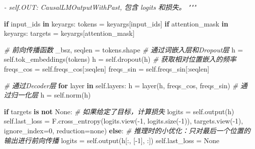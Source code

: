 \documentclass[
]{article}
\newenvironment{Shaded}{}{}
\newcommand{\CommentTok}[1]{\textcolor[rgb]{0.38,0.63,0.69}{\textit{#1}}}
\newcommand{\ControlFlowTok}[1]{\textcolor[rgb]{0.00,0.44,0.13}{\textbf{#1}}}
\newcommand{\DecValTok}[1]{\textcolor[rgb]{0.25,0.63,0.44}{#1}}
\newcommand{\KeywordTok}[1]{\textcolor[rgb]{0.00,0.44,0.13}{\textbf{#1}}}
\newcommand{\NormalTok}[1]{#1}
\newcommand{\OperatorTok}[1]{\textcolor[rgb]{0.40,0.40,0.40}{#1}}
\newcommand{\StringTok}[1]{\textcolor[rgb]{0.25,0.44,0.63}{#1}}
\newcommand{\VariableTok}[1]{\textcolor[rgb]{0.10,0.09,0.49}{#1}}
\begin{document}
\begin{Shaded}
\begin{Highlighting}[]
\CommentTok{        {-} self.OUT: CausalLMOutputWithPast, 包含 logits 和损失。}
\CommentTok{        """}

        \ControlFlowTok{if} \StringTok{\textquotesingle{}input\_ids\textquotesingle{}} \KeywordTok{in}\NormalTok{ keyargs:}
\NormalTok{            tokens }\OperatorTok{=}\NormalTok{ keyargs[}\StringTok{\textquotesingle{}input\_ids\textquotesingle{}}\NormalTok{]}
        \ControlFlowTok{if} \StringTok{\textquotesingle{}attention\_mask\textquotesingle{}} \KeywordTok{in}\NormalTok{ keyargs:}
\NormalTok{            targets }\OperatorTok{=}\NormalTok{ keyargs[}\StringTok{\textquotesingle{}attention\_mask\textquotesingle{}}\NormalTok{]}

        \CommentTok{\# 前向传播函数}
\NormalTok{        \_bsz, seqlen }\OperatorTok{=}\NormalTok{ tokens.shape}
        \CommentTok{\# 通过词嵌入层和Dropout层}
\NormalTok{        h }\OperatorTok{=} \VariableTok{self}\NormalTok{.tok\_embeddings(tokens)}
\NormalTok{        h }\OperatorTok{=} \VariableTok{self}\NormalTok{.dropout(h)}
        \CommentTok{\# 获取相对位置嵌入的频率}
\NormalTok{        freqs\_cos }\OperatorTok{=} \VariableTok{self}\NormalTok{.freqs\_cos[:seqlen]}
\NormalTok{        freqs\_sin }\OperatorTok{=} \VariableTok{self}\NormalTok{.freqs\_sin[:seqlen]}

        \CommentTok{\# 通过Decoder层}
        \ControlFlowTok{for}\NormalTok{ layer }\KeywordTok{in} \VariableTok{self}\NormalTok{.layers:}
\NormalTok{            h }\OperatorTok{=}\NormalTok{ layer(h, freqs\_cos, freqs\_sin)}
        \CommentTok{\# 通过归一化层}
\NormalTok{        h }\OperatorTok{=} \VariableTok{self}\NormalTok{.norm(h)}

        \ControlFlowTok{if}\NormalTok{ targets }\KeywordTok{is} \KeywordTok{not} \VariableTok{None}\NormalTok{:}
            \CommentTok{\# 如果给定了目标，计算损失}
\NormalTok{            logits }\OperatorTok{=} \VariableTok{self}\NormalTok{.output(h)}
            \VariableTok{self}\NormalTok{.last\_loss }\OperatorTok{=}\NormalTok{ F.cross\_entropy(logits.view(}\OperatorTok{{-}}\DecValTok{1}\NormalTok{, logits.size(}\OperatorTok{{-}}\DecValTok{1}\NormalTok{)), targets.view(}\OperatorTok{{-}}\DecValTok{1}\NormalTok{), ignore\_index}\OperatorTok{=}\DecValTok{0}\NormalTok{, reduction}\OperatorTok{=}\StringTok{\textquotesingle{}none\textquotesingle{}}\NormalTok{)}
        \ControlFlowTok{else}\NormalTok{:}
            \CommentTok{\# 推理时的小优化：只对最后一个位置的输出进行前向传播}
\NormalTok{            logits }\OperatorTok{=} \VariableTok{self}\NormalTok{.output(h[:, [}\OperatorTok{{-}}\DecValTok{1}\NormalTok{], :]) }
            \VariableTok{self}\NormalTok{.last\_loss }\OperatorTok{=} \VariableTok{None}


\end{Highlighting}
\end{Shaded}
\end{document}
